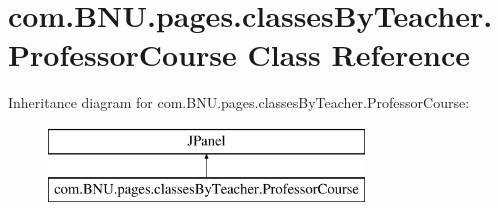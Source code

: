 \hypertarget{classcom_1_1_b_n_u_1_1pages_1_1classes_by_teacher_1_1_professor_course}{}\section{com.\+B\+N\+U.\+pages.\+classes\+By\+Teacher.\+Professor\+Course Class Reference}
\label{classcom_1_1_b_n_u_1_1pages_1_1classes_by_teacher_1_1_professor_course}
Inheritance diagram for com.\+B\+N\+U.\+pages.\+classes\+By\+Teacher.\+Professor\+Course\+:\begin{figure}[H]
\begin{center}
\leavevmode
\includegraphics[height=2.000000cm]{classcom_1_1_b_n_u_1_1pages_1_1classes_by_teacher_1_1_professor_course}
\end{center}
\end{figure}
